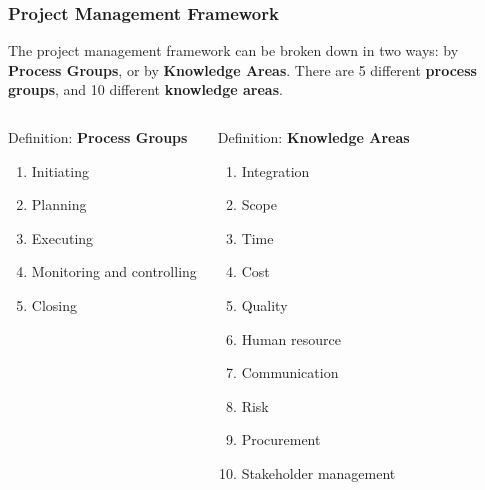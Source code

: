 \documentclass[aspectratio=169]{beamer}
\begin{document}
\begin{frame}
\frametitle{Project Management Framework}
The project management framework can be broken down in two ways: by \textbf{Process Groups}, or by \textbf{Knowledge Areas}. There are 5 different \textbf{process groups}, and 10 different \textbf{knowledge areas}.
\vspace{-0.5cm}
\begin{columns}[t]
\begin{block}{Definition: \textbf{Process Groups}}
\begin{enumerate} \footnotesize
\item Initiating
\item Planning
\item Executing
\item Monitoring and controlling
\item Closing
\end{enumerate}
\end{block}
\begin{block}{Definition: \textbf{Knowledge Areas}}
\begin{enumerate} \footnotesize
\item Integration
\item Scope
\item Time
\item Cost
\item Quality
\item Human resource
\item Communication
\item Risk
\item Procurement
\item Stakeholder management
\end{enumerate}
\end{block}
\end{columns}
\end{frame}
\end{document}
